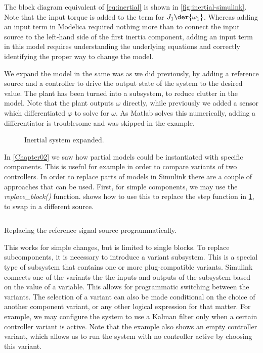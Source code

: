 \documentclass[\rootfolder/main.tex]{subfiles}
\begin{document}
The block diagram equivalent of \cref{eq:inertial} is shown in \cref{fig:inertial-simulink}.
Note that the input torque is added to the term for $J_{1} \der{\omega_{1}}$.
Whereas adding an input term in Modelica required nothing more than to connect the input source to the left-hand side of the first inertia component,
adding an input term in this model requires understanding the underlying equations and correctly identifying the proper way to change the model.

We expand the model in the same was as we did previously, by adding a reference source and a controller to drive the output state of the system to the desired value.
The plant has been turned into a subsystem, to reduce clutter in the model.
Note that the plant outputs $\omega$ directly, while previously we added a sensor which differentiated $\varphi$ to solve for $\omega$.
As Matlab solves this numerically, adding a differentiator is troublesome and was skipped in the example.

\begin{figure}[ht]
    \caption{Inertial system expanded.\label{fig:inertial-simulink-expanded}}
\end{figure}

In \cref{Chapter02} we saw how partial models could be instantiated with specific components.
This is useful for example in order to compare variants of two controllers.
In order to replace parts of models in Simulink there are a couple of approaches that can be used.
First, for simple components, we may use the \emph{replace\_block()} function.
 shows how to use this to replace the step function in \cref{fig:inertial-simulink-expanded}, to swap in a different source.

\begin{listing}[ht]
    \inputminted[fontsize=\footnotesize, firstline=1, lastline=4]{matlab}{\rootfolder/Models/Matlab/ReplaceSource.m}
    \caption{Replacing the reference signal source programmatically.\label{lst:matlab-replace}}
\end{listing}

This works for simple changes, but is limited to single blocks.
To replace subcomponents, it is necessary to introduce a variant subsystem.
This is a special type of subsystem that contains one or more plug-compatible variants.
Simulink connects one of the variants the the inputs and outputs of the subsystem based on the value of a variable.
This allows for programmatic switching between the variants.
The selection of a variant can also be made conditional on the choice of another component variant, or any other logical expression for that matter.
For example, we may configure the system to use a Kalman filter only when a certain controller variant is active.
Note that the example also shows an empty controller variant, which allows us to run the system with no controller active by choosing this variant.
\end{document}
